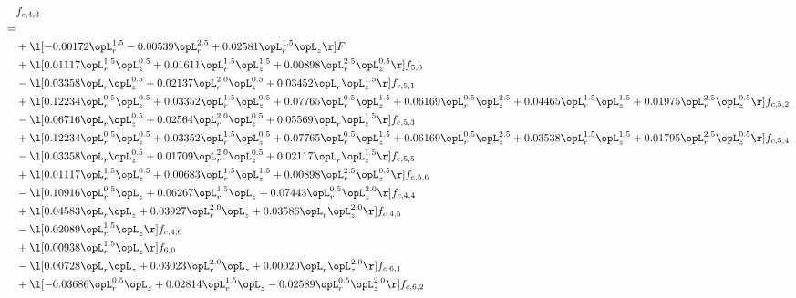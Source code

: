 \begin{alignat}{2} 
\label{eq:f_43_2} 
& f_{c,4,3} \nonumber \\ 
 = \\ 
& + \l[  -0.00172 \opL_r^{1.5}   -0.00539 \opL_r^{2.5} +  0.02581 \opL_r^{1.5} \opL_z  \r] F \nonumber \\ 
& + \l[  0.01117 \opL_r^{1.5} \opL_z^{0.5} +  0.01611 \opL_r^{1.5} \opL_z^{1.5} +  0.00898 \opL_r^{2.5} \opL_z^{0.5}  \r] f_{5,0} \nonumber \\ 
& - \l[  0.03358 \opL_r \opL_z^{0.5} +  0.02137 \opL_r^{2.0} \opL_z^{0.5} +  0.03452 \opL_r \opL_z^{1.5}  \r] f_{c,5,1} \nonumber \\ 
& + \l[  0.12234 \opL_r^{0.5} \opL_z^{0.5} +  0.03352 \opL_r^{1.5} \opL_z^{0.5} +  0.07765 \opL_r^{0.5} \opL_z^{1.5} +  0.06169 \opL_r^{0.5} \opL_z^{2.5} +  0.04465 \opL_r^{1.5} \opL_z^{1.5} +  0.01975 \opL_r^{2.5} \opL_z^{0.5}  \r] f_{c,5,2} \nonumber \\ 
& - \l[  0.06716 \opL_r \opL_z^{0.5} +  0.02564 \opL_r^{2.0} \opL_z^{0.5} +  0.05569 \opL_r \opL_z^{1.5}  \r] f_{c,5,3} \nonumber \\ 
& + \l[  0.12234 \opL_r^{0.5} \opL_z^{0.5} +  0.03352 \opL_r^{1.5} \opL_z^{0.5} +  0.07765 \opL_r^{0.5} \opL_z^{1.5} +  0.06169 \opL_r^{0.5} \opL_z^{2.5} +  0.03538 \opL_r^{1.5} \opL_z^{1.5} +  0.01795 \opL_r^{2.5} \opL_z^{0.5}  \r] f_{c,5,4} \nonumber \\ 
& - \l[  0.03358 \opL_r \opL_z^{0.5} +  0.01709 \opL_r^{2.0} \opL_z^{0.5} +  0.02117 \opL_r \opL_z^{1.5}  \r] f_{c,5,5} \nonumber \\ 
& + \l[  0.01117 \opL_r^{1.5} \opL_z^{0.5} +  0.00683 \opL_r^{1.5} \opL_z^{1.5} +  0.00898 \opL_r^{2.5} \opL_z^{0.5}  \r] f_{c,5,6} \nonumber \\ 
& - \l[  0.10916 \opL_r^{0.5} \opL_z +  0.06267 \opL_r^{1.5} \opL_z +  0.07443 \opL_r^{0.5} \opL_z^{2.0}  \r] f_{c,4,4} \nonumber \\ 
& + \l[  0.04583 \opL_r \opL_z +  0.03927 \opL_r^{2.0} \opL_z +  0.03586 \opL_r \opL_z^{2.0}  \r] f_{c,4,5} \nonumber \\ 
& - \l[  0.02089 \opL_r^{1.5} \opL_z  \r] f_{c,4,6} \nonumber \\ 
& + \l[  0.00938 \opL_r^{1.5} \opL_z  \r] f_{6,0} \nonumber \\ 
& - \l[  0.00728 \opL_r \opL_z +  0.03023 \opL_r^{2.0} \opL_z +  0.00020 \opL_r \opL_z^{2.0}  \r] f_{c,6,1} \nonumber \\ 
& + \l[  -0.03686 \opL_r^{0.5} \opL_z +  0.02814 \opL_r^{1.5} \opL_z   -0.02589 \opL_r^{0.5} \opL_z^{2.0}  \r] f_{c,6,2} \nonumber \\ 

\end{alignat}
